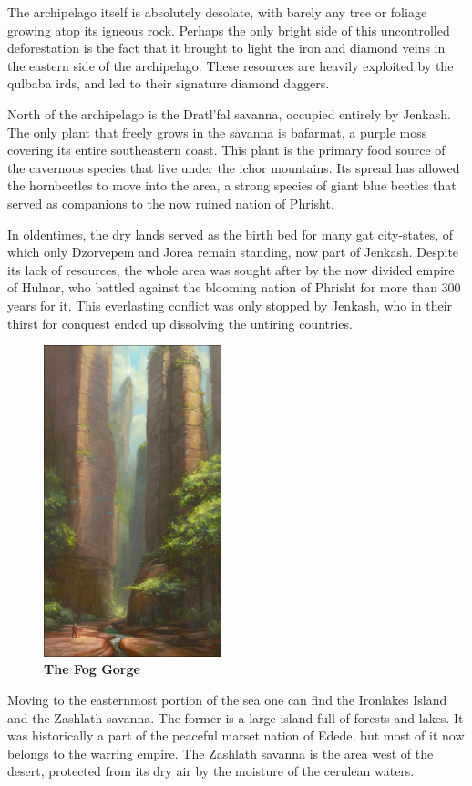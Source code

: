 The archipelago itself is absolutely desolate, with barely any tree or foliage growing atop its igneous rock.
Perhaps the only bright side of this uncontrolled deforestation is the fact that it brought to light the iron and diamond veins in the eastern side of the archipelago.
These resources are heavily exploited by the qulbaba irds, and led to their signature diamond daggers.

North of the archipelago is the Dratl'fal savanna, occupied entirely by Jenkash.
The only plant that freely grows in the savanna is bafarmat, a purple moss covering its entire southeastern coast.
This plant is the primary food source of the cavernous species that live under the ichor mountains.
Its spread has allowed the hornbeetles to move into the area, a strong species of giant blue beetles that served as companions to the now ruined nation of Phrisht.

In oldentimes, the dry lands served as the birth bed for many gat city-states, of which only Dzorvepem and Jorea remain standing, now part of Jenkash.
Despite its lack of resources, the whole area was sought after by the now divided empire of Hulnar, who battled against the blooming nation of Phrisht for more than 300 years for it.
This everlasting conflict was only stopped by Jenkash, who in their thirst for conquest ended up dissolving the untiring countries.

\begin{figure}[t]
    \centering
    \includegraphics[width=0.46\textwidth]{01yuadrem/img/14fog_gorge.png}
    \caption*{\centering \large{\textbf{The Fog Gorge}}} %
\end{figure}

Moving to the easternmost portion of the sea one can find the Ironlakes Island and the Zashlath savanna.
The former is a large island full of forests and lakes.
It was historically a part of the peaceful marset nation of Edede, but most of it now belongs to the warring empire.
The Zashlath savanna is the area west of the desert, protected from its dry air by the moisture of the cerulean waters.
